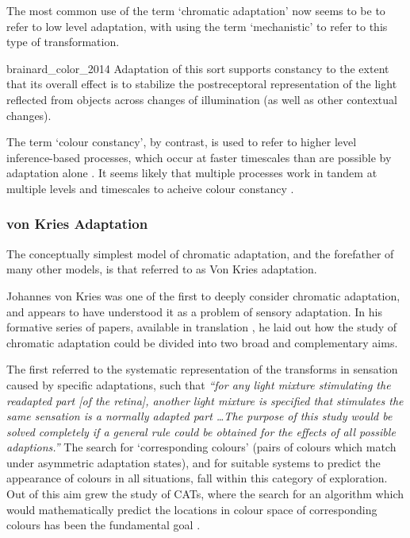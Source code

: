 The most common use of the term `chromatic adaptation' now seems to be to refer to low level adaptation, with \citet{brainard_color_2014} using the term `mechanistic' to refer to this type of transformation.

\begin{citequote}{brainard_color_2014}
Adaptation of this sort supports constancy to the extent that its overall effect is to stabilize the postreceptoral representation of the light reflected from objects across changes of illumination (as well as other contextual changes).
\end{citequote}

The term `colour constancy', by contrast, is used to refer to higher level inference-based processes, which occur at faster timescales than are possible by adaptation alone \citep{rinner_time_2000}. It seems likely that multiple processes work in tandem at multiple levels and timescales to acheive colour constancy \citep{hurlbert_colour_2007}.

\subsubsection{von Kries Adaptation}

The conceptually simplest model of chromatic adaptation, and the forefather of many other models, is that referred to as Von Kries adaptation.

Johannes von Kries was one of the first to deeply consider chromatic adaptation, and appears to have understood it as a problem of sensory adaptation. In his formative series of papers, available in translation \citep{von_kries_beitrag_1970}, he laid out how the study of chromatic adaptation could be divided into two broad and complementary aims. 

The first referred to the systematic representation of the transforms in sensation caused by specific adaptations, such that \textit{``for any light mixture stimulating the readapted part [of the retina], another light mixture is specified that stimulates the same sensation is a normally adapted part \dots The purpose of this study would be solved completely if a general rule could be obtained for the effects of all possible adaptions.''} The search for `corresponding colours' (pairs of colours which match under asymmetric adaptation states), and for suitable systems to predict the appearance of colours in all situations, fall within this category of exploration. Out of this aim grew the study of \glspl{CAT}, where the search for an algorithm which would mathematically predict the locations in colour space of corresponding colours has been the fundamental goal \citep{cie_cie_2004-1}.

